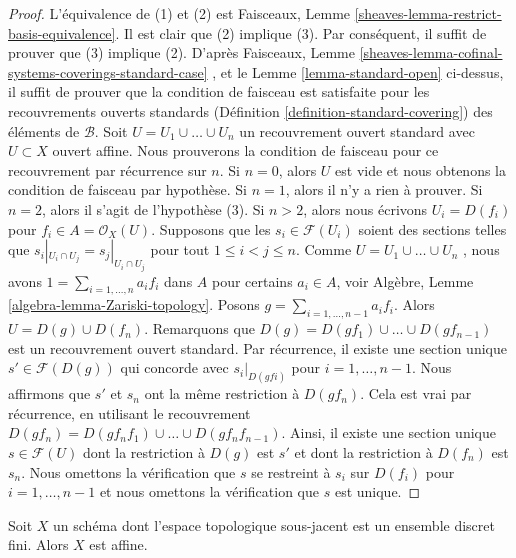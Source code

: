 \begin{proof}
L'équivalence de (1) et (2) est Faisceaux, Lemme  \ref{sheaves-lemma-restrict-basis-equivalence}. Il est clair
que (2) implique (3). Par conséquent, il suffit de prouver que (3) implique (2).
D'après Faisceaux, Lemme  \ref{sheaves-lemma-cofinal-systems-coverings-standard-case} , et le Lemme  \ref{lemma-standard-open}  ci-dessus, il suffit de
prouver que la condition de faisceau est satisfaite pour les recouvrements ouverts
standards (Définition  \ref{definition-standard-covering}) des éléments de  $\mathcal{B}$. Soit
 $U = U_1 \cup \ldots \cup U_n$  un recouvrement ouvert standard avec  $U \subset X$  ouvert affine. Nous
prouverons la condition de faisceau pour ce recouvrement par récurrence sur
 $n$. Si  $n = 0$, alors  $U$  est vide et nous obtenons la
condition de faisceau par hypothèse. Si  $n = 1$, alors il n'y a rien à
prouver. Si  $n = 2$, alors il s'agit de l'hypothèse (3). Si  $n > 2$,
alors nous écrivons  $U_i = D(f_i)$  pour  $f_i \in A = \mathcal{O}_X(U)$. Supposons que les  $s_i \in \mathcal{F}(U_i)$ 
soient des sections telles que  $s_i|_{U_i \cap U_j} = s_j|_{U_i \cap U_j}$  pour tout  $1 \leq i < j \leq n$. Comme
 $U = U_1 \cup \ldots \cup U_n$ , nous avons  $1 = \sum_{i = 1, \ldots, n} a_i f_i$  dans  $A$  pour certains  $a_i \in A$,
voir Algèbre, Lemme  \ref{algebra-lemma-Zariski-topology}. Posons  $g = \sum_{i = 1, \ldots, n - 1} a_if_i$. Alors  $U = D(g) \cup D(f_n)$.
Remarquons que  $D(g) = D(gf_1) \cup \ldots \cup D(gf_{n - 1})$  est un recouvrement ouvert standard. Par récurrence, il
existe une section unique  $s' \in \mathcal{F}(D(g))$  qui concorde avec  $s_i|_{D(gfi)}$  pour
 $i = 1, \ldots, n - 1$. Nous affirmons que  $s'$  et  $s_n$  ont la même
restriction à  $D(gf_n)$. Cela est vrai par récurrence, en utilisant le recouvrement
 $D(gf_n) = D(gf_nf_1) \cup \ldots \cup D(gf_nf_{n - 1})$. Ainsi, il existe une section unique  $s \in \mathcal{F}(U)$  dont la restriction
à  $D(g)$  est  $s'$  et dont la restriction à  $D(f_n)$  est
 $s_n$. Nous omettons la vérification que  $s$  se restreint à
 $s_i$  sur  $D(f_i)$  pour  $i = 1, \ldots, n - 1$  et nous omettons la vérification
que  $s$  est unique.
\end{proof}

\begin{lemma}
\label{lemma-scheme-finite-discrete-affine}
Soit  $X$  un schéma dont l'espace topologique sous-jacent est un ensemble
discret fini. Alors  $X$  est affine.
\end{lemma}

